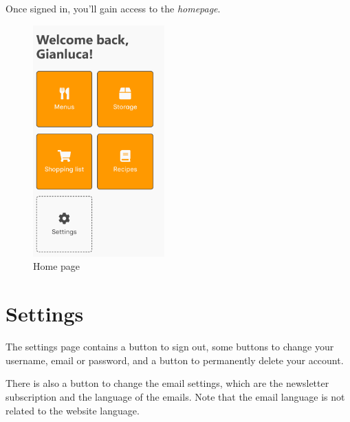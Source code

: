 \documentclass[12pt, a4paper]{report}
\begin{document}
    Once signed in, you'll gain access to the \emph{homepage}.

    \begin{figure}[H]
        \centering
        \includegraphics[width=0.45\textwidth]{assets/en/home.png}
        \caption{Home page}
    \end{figure}

    \section{Settings}

    The settings page contains a button to sign out, some buttons to change your username, email or password, and a button to permanently delete your
    account.

	\label{newsletter} There is also a button to change the email settings, which are the newsletter subscription and the language of the emails.
	Note that the email language is not related to the website language.
\end{document}
